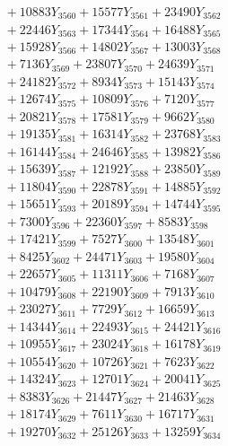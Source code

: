 \documentclass[a4paper,10pt]{article}
\begin{document}
{\begin{align}
&\;  + 10883 Y_{3560} + 15577 Y_{3561} + 23490 Y_{3562} \\[0.3ex]
&\;  + 22446 Y_{3563} + 17344 Y_{3564} + 16488 Y_{3565} \\[0.3ex]
&\;  + 15928 Y_{3566} + 14802 Y_{3567} + 13003 Y_{3568} \\[0.5ex]\allowbreak
&\;  + 7136 Y_{3569} + 23807 Y_{3570} + 24639 Y_{3571} \\[0.3ex]
&\;  + 24182 Y_{3572} + 8934 Y_{3573} + 15143 Y_{3574} \\[0.3ex]
&\;  + 12674 Y_{3575} + 10809 Y_{3576} + 7120 Y_{3577} \\[0.3ex]
&\;  + 20821 Y_{3578} + 17581 Y_{3579} + 9662 Y_{3580} \\[0.3ex]
&\;  + 19135 Y_{3581} + 16314 Y_{3582} + 23768 Y_{3583} \\[0.3ex]
&\;  + 16144 Y_{3584} + 24646 Y_{3585} + 13982 Y_{3586} \\[0.3ex]
&\;  + 15639 Y_{3587} + 12192 Y_{3588} + 23850 Y_{3589} \\[0.3ex]
&\;  + 11804 Y_{3590} + 22878 Y_{3591} + 14885 Y_{3592} \\[0.3ex]
&\;  + 15651 Y_{3593} + 20189 Y_{3594} + 14744 Y_{3595} \\[0.3ex]
&\;  + 7300 Y_{3596} + 22360 Y_{3597} + 8583 Y_{3598} \\[0.5ex]\allowbreak
&\;  + 17421 Y_{3599} + 7527 Y_{3600} + 13548 Y_{3601} \\[0.3ex]
&\;  + 8425 Y_{3602} + 24471 Y_{3603} + 19580 Y_{3604} \\[0.3ex]
&\;  + 22657 Y_{3605} + 11311 Y_{3606} + 7168 Y_{3607} \\[0.3ex]
&\;  + 10479 Y_{3608} + 22190 Y_{3609} + 7913 Y_{3610} \\[0.3ex]
&\;  + 23027 Y_{3611} + 7729 Y_{3612} + 16659 Y_{3613} \\[0.3ex]
&\;  + 14344 Y_{3614} + 22493 Y_{3615} + 24421 Y_{3616} \\[0.3ex]
&\;  + 10955 Y_{3617} + 23024 Y_{3618} + 16178 Y_{3619} \\[0.3ex]
&\;  + 10554 Y_{3620} + 10726 Y_{3621} + 7623 Y_{3622} \\[0.3ex]
&\;  + 14324 Y_{3623} + 12701 Y_{3624} + 20041 Y_{3625} \\[0.3ex]
&\;  + 8383 Y_{3626} + 21447 Y_{3627} + 21463 Y_{3628} \\[0.5ex]\allowbreak
&\;  + 18174 Y_{3629} + 7611 Y_{3630} + 16717 Y_{3631} \\[0.3ex]
&\;  + 19270 Y_{3632} + 25126 Y_{3633} + 13259 Y_{3634} \\[0.3ex]

\end{align}}
\end{document}

